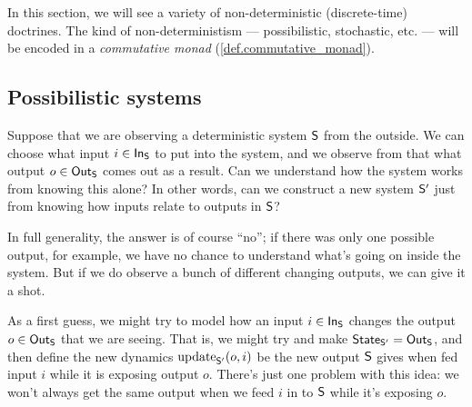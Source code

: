 \documentclass[DynamicalBook]{subfiles}
\begin{document}
In this section, we will see a variety of non-deterministic (discrete-time)
doctrines. The kind of non-deterministism --- possibilistic, stochastic, etc.
--- will be encoded in a \emph{commutative monad}
(\cref{def.commutative_monad}). 

\subsection{Possibilistic  systems}

Suppose that we are observing a deterministic system $\mathsf{S}$ from the outside.
We can choose what input $i \in \mathsf{In}_{\mathsf{S}}$ to put into the system, and we observe
from that what output $o \in \mathsf{Out}_{\mathsf{S}}$ comes out as a result. Can we understand
how the system works from knowing this alone? In other words, can we construct a
new system $\mathsf{S'}$ just from knowing how inputs relate to outputs in $\mathsf{S}$?

In full generality, the answer is of course ``no''; if there was only one
possible output, for example, we have no chance to understand what's going on
inside the system. But if we do observe a bunch of different changing outputs,
we can give it a shot.

As a first guess, we might try to model how an input $i \in \mathsf{In}_{\mathsf{S}}$ changes the
output $o \in \mathsf{Out}_{\mathsf{S}}$ that we are seeing. That is, we might try and make
$\mathsf{State}_{\mathsf{S'}} = \mathsf{Out}_{\mathsf{S}}$, and then define the new dynamics $\mathrm{update}_{\mathsf{S'}}(o, i)$ be
the new output $\mathsf{S}$ gives when fed input $i$ while it is exposing output
$o$. There's just one problem with this idea: we won't always get the same
output when we feed $i$ in to $\mathsf{S}$ while it's exposing $o$.
\end{document}
